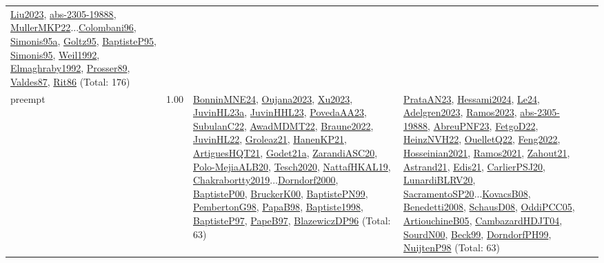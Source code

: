 {\begin{longtable}{p{3cm}r>{\raggedright\arraybackslash}p{6cm}>{\raggedright\arraybackslash}p{6cm}>{\raggedright\arraybackslash}p{8cm}}
\hyperref[detail:Liu2023]{Liu2023}, \hyperref[detail:abs-2305-19888]{abs-2305-19888}, \hyperref[detail:MullerMKP22]{MullerMKP22}...\hyperref[detail:Colombani96]{Colombani96}, \hyperref[detail:Simonis95a]{Simonis95a}, \hyperref[detail:Goltz95]{Goltz95}, \hyperref[detail:BaptisteP95]{BaptisteP95}, \hyperref[detail:Simonis95]{Simonis95}, \hyperref[detail:Weil1992]{Weil1992}, \hyperref[detail:Elmaghraby1992]{Elmaghraby1992}, \hyperref[detail:Prosser89]{Prosser89}, \hyperref[detail:Valdes87]{Valdes87}, \hyperref[detail:Rit86]{Rit86} (Total: 176)\\
\index{preempt}\index{Concepts!preempt}preempt &  1.00 & \hyperref[detail:BonninMNE24]{BonninMNE24}, \hyperref[detail:Oujana2023]{Oujana2023}, \hyperref[detail:Xu2023]{Xu2023}, \hyperref[detail:JuvinHL23a]{JuvinHL23a}, \hyperref[detail:JuvinHHL23]{JuvinHHL23}, \hyperref[detail:PovedaAA23]{PovedaAA23}, \hyperref[detail:SubulanC22]{SubulanC22}, \hyperref[detail:AwadMDMT22]{AwadMDMT22}, \hyperref[detail:Braune2022]{Braune2022}, \hyperref[detail:JuvinHL22]{JuvinHL22}, \hyperref[detail:Groleaz21]{Groleaz21}, \hyperref[detail:HanenKP21]{HanenKP21}, \hyperref[detail:ArtiguesHQT21]{ArtiguesHQT21}, \hyperref[detail:Godet21a]{Godet21a}, \hyperref[detail:ZarandiASC20]{ZarandiASC20}, \hyperref[detail:Polo-MejiaALB20]{Polo-MejiaALB20}, \hyperref[detail:Tesch2020]{Tesch2020}, \hyperref[detail:NattafHKAL19]{NattafHKAL19}, \hyperref[detail:Chakrabortty2019]{Chakrabortty2019}...\hyperref[detail:Dorndorf2000]{Dorndorf2000}, \hyperref[detail:BaptisteP00]{BaptisteP00}, \hyperref[detail:BruckerK00]{BruckerK00}, \hyperref[detail:BaptistePN99]{BaptistePN99}, \hyperref[detail:PembertonG98]{PembertonG98}, \hyperref[detail:PapaB98]{PapaB98}, \hyperref[detail:Baptiste1998]{Baptiste1998}, \hyperref[detail:BaptisteP97]{BaptisteP97}, \hyperref[detail:PapeB97]{PapeB97}, \hyperref[detail:BlazewiczDP96]{BlazewiczDP96} (Total: 63) & \hyperref[detail:PrataAN23]{PrataAN23}, \hyperref[detail:Hessami2024]{Hessami2024}, \hyperref[detail:Le24]{Le24}, \hyperref[detail:Adelgren2023]{Adelgren2023}, \hyperref[detail:Ramos2023]{Ramos2023}, \hyperref[detail:abs-2305-19888]{abs-2305-19888}, \hyperref[detail:AbreuPNF23]{AbreuPNF23}, \hyperref[detail:FetgoD22]{FetgoD22}, \hyperref[detail:HeinzNVH22]{HeinzNVH22}, \hyperref[detail:OuelletQ22]{OuelletQ22}, \hyperref[detail:Feng2022]{Feng2022}, \hyperref[detail:Hosseinian2021]{Hosseinian2021}, \hyperref[detail:Ramos2021]{Ramos2021}, \hyperref[detail:Zahout21]{Zahout21}, \hyperref[detail:Astrand21]{Astrand21}, \hyperref[detail:Edis21]{Edis21}, \hyperref[detail:CarlierPSJ20]{CarlierPSJ20}, \hyperref[detail:LunardiBLRV20]{LunardiBLRV20}, \hyperref[detail:SacramentoSP20]{SacramentoSP20}...\hyperref[detail:KovacsB08]{KovacsB08}, \hyperref[detail:Benedetti2008]{Benedetti2008}, \hyperref[detail:SchausD08]{SchausD08}, \hyperref[detail:OddiPCC05]{OddiPCC05}, \hyperref[detail:ArtiouchineB05]{ArtiouchineB05}, \hyperref[detail:CambazardHDJT04]{CambazardHDJT04}, \hyperref[detail:SourdN00]{SourdN00}, \hyperref[detail:Beck99]{Beck99}, \hyperref[detail:DorndorfPH99]{DorndorfPH99}, \hyperref[detail:NuijtenP98]{NuijtenP98} (Total: 63) & 
\end{longtable}}
